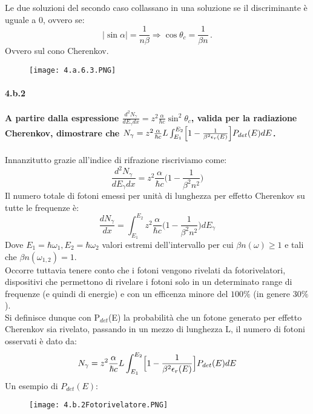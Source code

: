 \documentclass[twoside]{article}
\begin{document}
Le due soluzioni del secondo caso collassano in una soluzione se il discriminante è uguale a 0, ovvero se:
\begin{equation*}
|\sin\alpha|=\frac{1}{n\beta} \Rightarrow \cos\theta_c=\frac{1}{\beta n} \, .
\end{equation*}
Ovvero sul cono Cherenkov.\\
\begin{figure}[H]
    \centering
    \texttt{[image: 4.a.6.3.PNG]}
\end{figure}

\paragraph{4.b.2}\textbf{A partire dalla espressione $\frac{d^2 N_\gamma}{dE_\gamma dx}=z^2 \frac{\alpha}{\hbar c} \sin^2 \theta_c$, valida per la radiazione Cherenkov, dimostrare che $N_\gamma=z^2 \frac{\alpha}{\hbar c} L \int_{E_1}^{E_2} \Bigl[ 1-\frac{1}{\beta^2 \epsilon_r(E)} \Bigr] P_{det}(E)dE$.}\\ \\
Innanzitutto grazie all'indice di rifrazione riscriviamo come:
\begin{equation}
    \frac{d^2 N_\gamma}{dE_\gamma dx}=z^2 \frac{\alpha}{\hbar c}\biggl(1-\frac{1}{\beta^2n^2}\biggr)
\end{equation}
Il numero totale di fotoni emessi per unità di lunghezza per effetto Cherenkov su tutte le frequenze è:
\begin{equation}
    \frac{d N_\gamma}{dx}=\int_{E_1}^{E_2}z^2 \frac{\alpha}{\hbar c}\biggl(1-\frac{1}{\beta^2n^2}\biggr)dE_\gamma
\end{equation}
Dove $E_1=\hbar \omega_1,E_2=\hbar \omega_2$ valori estremi dell'intervallo per cui $\beta n(\omega)\ge 1$ e tali che $\beta n(\omega_{1,2})=1$.\\
Occorre tuttavia tenere conto che i fotoni vengono rivelati da fotorivelatori, dispositivi che permettono di rivelare i fotoni solo in un determinato range di frequenze (e quindi di energie) e con un efficenza minore del $100\%$ (in genere 30$\%$).\\
Si definisce dunque con P$_{det}$(E) la probabilità che un fotone generato per effetto Cherenkov sia rivelato, passando in un mezzo di lunghezza L, il numero di fotoni osservati è dato da:
\begin{equation}
    N_\gamma=z^2 \frac{\alpha}{\hbar c} L \int_{E_1}^{E_2} \Bigl[ 1-\frac{1}{\beta^2 \epsilon_r(E)} \Bigr] P_{det}(E)dE 
\end{equation}
Un esempio di $P_{det}(E)$:
\begin{figure}[H]
    \centering
    \texttt{[image: 4.b.2Fotorivelatore.PNG]}
\end{figure}
\end{document}

